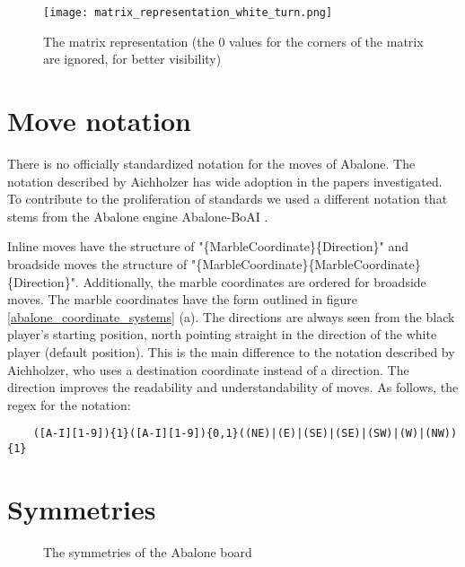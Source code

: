 \begin{figure}[!h]
    \centering
    \texttt{[image: matrix\_representation\_white\_turn.png]}
    \caption{The matrix representation (the $0$ values for the corners of the matrix are ignored, for better visibility)}
    \label{abalone_matrix_representation}
\end{figure}

\section{Move notation}
There is no officially standardized notation for the moves of Abalone. The notation described by Aichholzer \cite{aichholzer_abalone_2006} has wide adoption in the papers investigated. To contribute to the proliferation of standards \cite{xkcd_standards_nodate} we used a different notation that stems from the Abalone engine Abalone-BoAI \cite{scriptim_scriptimabalone-boai_2021}.

Inline moves have the structure of "\{MarbleCoordinate\}\{Direction\}" and broadside moves the structure of "\{MarbleCoordinate\}\{MarbleCoordinate\}\{Direction\}". Additionally, the marble coordinates are ordered for broadside moves. The marble coordinates have the form outlined in figure \ref{abalone_coordinate_systems} (a). The directions are always seen from the black player's starting position, north pointing straight in the direction of the white player (default position). This is the main difference to the notation described by Aichholzer, who uses a destination coordinate instead of a direction. The direction improves the readability and understandability of moves. As follows, the regex for the notation:

\begin{BVerbatim}
    ([A-I][1-9]){1}([A-I][1-9]){0,1}((NE)|(E)|(SE)|(SE)|(SW)|(W)|(NW)){1}
\end{BVerbatim}

\section{Symmetries}
\label{abalone_symmetries}

\begin{figure}
    \centering
    \caption{The symmetries of the Abalone board}
    \label{abalone_symmetries_figure}
\end{figure}

